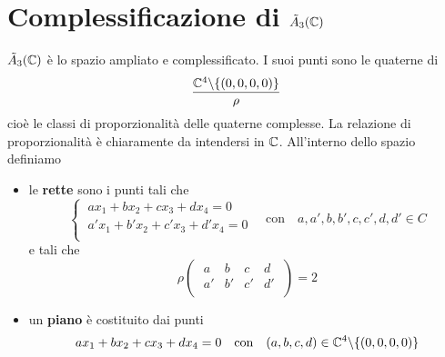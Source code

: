 \documentclass{report}
\begin{document}
\section{Complessificazione di \(\tilde{A}_{3}(\CC)\)}
\(\tilde{A}_{3}(\CC) \) è lo spazio ampliato e complessificato. I suoi punti sono le quaterne di \[
\frac{\CC ^{4} \backslash  \{(0,0,0,0)\}}{\rho }
\] cioè le classi di proporzionalità delle quaterne complesse. La relazione di proporzionalità è chiaramente da intendersi in \(\CC\). All'interno dello spazio definiamo
 \begin{itemize}
    \item le \textbf{rette} sono i punti tali che \[
\begin{cases}
    \ ax_1+ bx_2 + cx_3+dx_4 =0 \\
    \ a'x_1 + b'x_2 + c'x_3 + d'x_4 = 0 \\
\end{cases} \quad \text{con}\quad a,a',b,b',c,c',d,d' \in C
    \] e tali che \[
    \rho
\left( \; \begin{matrix}
    a & b & c & d \\
    a' & b' & c' & d' \\
\end{matrix} \; \right) = 2
    \]
    \item un \textbf{piano} è costituito dai punti \[
    ax_1 + bx_2+cx_3+dx_4 = 0 \quad \text{con}\quad (a,b,c,d) \in \CC^{4} \backslash \{(0,0,0,0)\} 
    \] 
\end{itemize}


\end{document}
